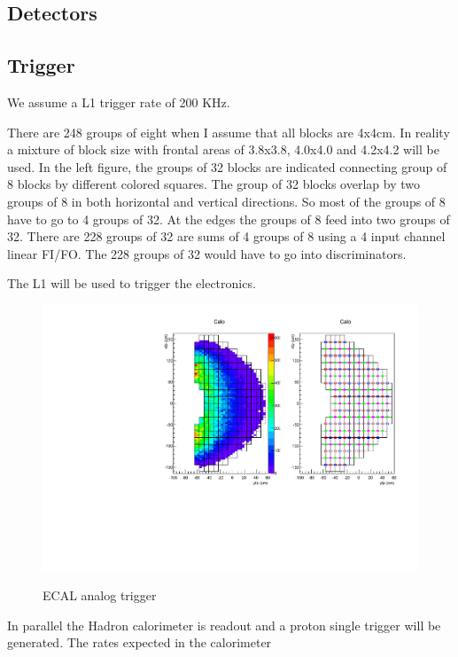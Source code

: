 \documentclass{article}
\begin{document}
\subsection{Detectors}



\subsection{Trigger}

We assume a L1 trigger rate of 200 KHz. 

There are 248 groups
of eight when I assume that all blocks are 4x4cm. In reality a mixture
of block size with frontal areas of 3.8x3.8, 4.0x4.0 and 4.2x4.2 will be
used. In the left figure, the groups of 32 blocks are indicated connecting
group of 8 blocks by different colored squares. The group of 32 blocks overlap
by two groups of 8 in both horizontal and vertical directions. So most of the
groups of 8 have to go to 4 groups of 32. At the edges the groups of 8 feed into
two groups of 32. There are 228  groups of 32 are sums of 4 groups of 8 using
a 4 input channel linear FI/FO. The 228 groups of 32 would have to
go into discriminators.

The L1 will be used to trigger the  electronics.

\begin{figure}
  \centering
  \includegraphics[width=\textwidth]{figs/cfpa.pdf}\\
  \caption{ECAL analog trigger }\label{fig:ECALTrig}
\end{figure}

In parallel the Hadron calorimeter is readout and a proton single trigger will be generated.
The rates expected in the calorimeter
\end{document}

